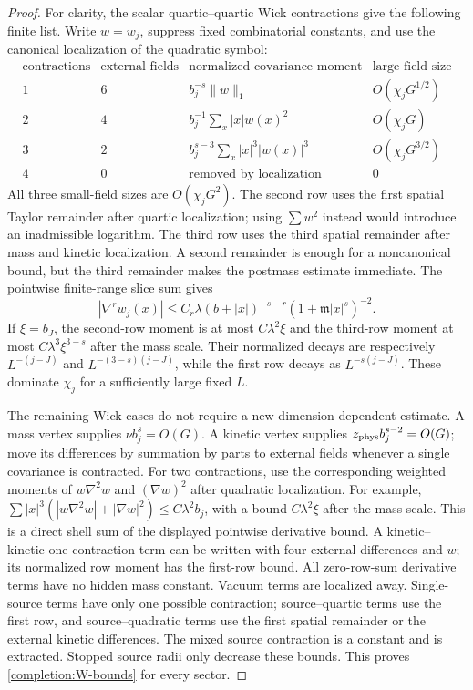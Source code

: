 \documentclass[11pt]{article}
\begin{document}
\begin{proof}
For clarity, the scalar quartic--quartic Wick contractions give the
following finite list. Write \(w=w_j\), suppress fixed combinatorial
constants, and use the canonical localization of the quadratic symbol:
\[
\begin{array}{c|c|c|c}
\text{contractions}&\text{external fields}&
 \text{normalized covariance moment}&\text{large-field size}\\ \hline
1&6&b_j^{-s}\|w\|_1& O(\chi_jG^{1/2})\\
2&4&b_j^{-1}\sum_x|x|w(x)^2&O(\chi_jG)\\
3&2&b_j^{s-3}\sum_x|x|^3|w(x)|^3&O(\chi_jG^{3/2})\\
4&0&\text{removed by localization}&0
\end{array}
\]
All three small-field sizes are \(O(\chi_jG^2)\). The second row
uses the first spatial Taylor remainder after quartic localization;
using \(\sum w^2\) instead would introduce an inadmissible logarithm.
The third row uses the third spatial remainder after mass and kinetic
localization. A second remainder is enough for a noncanonical bound,
but the third remainder makes the postmass estimate immediate.
The pointwise finite-range slice sum gives
\[
 |\nabla^rw_j(x)|\le C_r\lambda(b+|x|)^{-s-r}
                  (1+\mathfrak m|x|^s)^{-2}.
\]
If \(\xi=b_J\), the second-row moment is at most \(C\lambda^2\xi\)
and the third-row moment at most \(C\lambda^3\xi^{3-s}\) after the
mass scale. Their normalized decays are respectively
\(L^{-(j-J)}\) and \(L^{-(3-s)(j-J)}\), while the first row decays
as \(L^{-s(j-J)}\). These dominate \(\chi_j\) for a sufficiently
large fixed \(L\).

The remaining Wick cases do not require a new dimension-dependent
estimate. A mass vertex supplies \(\nu b_j^s=O(G)\). A kinetic vertex
supplies \(z_{\rm phys}b_j^{s-2}=O(G)\); move its differences by
summation by parts to external fields whenever a single covariance is
contracted. For two contractions, use the corresponding weighted
moments of \(w\nabla^2w\) and \((\nabla w)^2\) after quadratic
localization. For example,
\(\sum|x|^3(|w\nabla^2w|+|\nabla w|^2)\le C\lambda^2b_j\),
with a bound \(C\lambda^2\xi\) after the mass scale. This is a direct
shell sum of the displayed pointwise derivative bound. A
kinetic--kinetic one-contraction term can be written with four external
differences and \(w\); its normalized row moment has the first-row
bound. All zero-row-sum derivative terms have no hidden mass constant.
Vacuum terms are localized away. Single-source terms have only one
possible contraction; source--quartic terms use the first row, and
source--quadratic terms use the first spatial remainder or the
external kinetic differences. The mixed source contraction is a constant
and is extracted. Stopped source radii only decrease these bounds.
This proves \eqref{completion:W-bounds} for every sector.


\end{proof}
\end{document}
